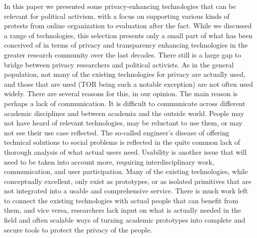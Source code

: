 In this paper we presented some privacy-enhancing technologies that can be relevant for political activism, with a focus on supporting various kinds of protests from online organization to evaluation after the fact. While we discussed a range of technologies, this selection presents only a small part of what has been conceived of in terms of privacy and transparency enhancing technologies in the greater research community over the last decades. There still is a large gap to bridge between privacy researchers and political activists. As in the general population, not many of the existing technologies for privacy are actually used, and those that are used (TOR being such a notable exception) are not often used widely. There are several reasons for this, in our opinion. The main reason is perhaps a lack of communication. It is difficult to communicate across different academic disciplines and between academia and the outside world. People may not have heard of relevant technologies, may be reluctant to use them, or may not see their use case reflected. The so-called engineer's disease of offering technical solutions to social problems is reflected in the quite common lack of thorough analysis of what actual users need. Usability is another issue that will need to be taken into account more, requiring interdisciplinary work, communication, and user participation. Many of the existing technologies, while conceptually excellent, only exist as prototypes, or as isolated primitives that are not integrated into a usable and comprehensive service. There is much work left to connect the existing technologies with actual people that can benefit from them, and vice versa, researchers lack input on what is actually needed in the field and often scalable ways of turning academic prototypes into complete and secure tools to protect the privacy of the people.
